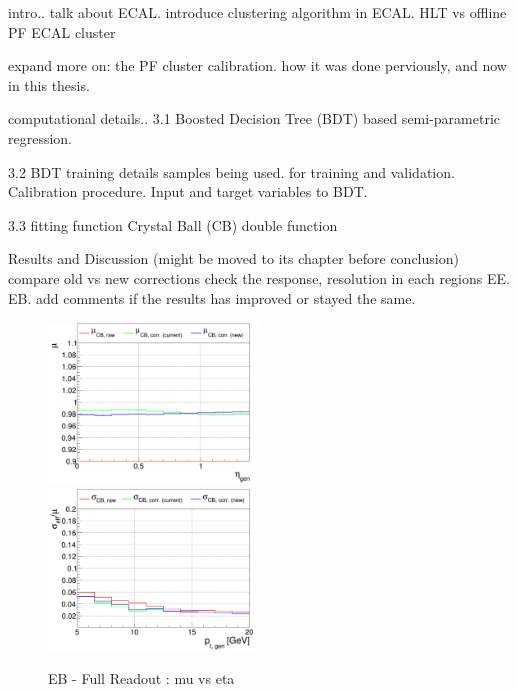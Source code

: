 
intro..
 talk about ECAL.
 introduce clustering algorithm in ECAL.
 HLT vs offline PF ECAL cluster

 expand more on:
  the PF cluster calibration.
  how it was done perviously, and now in this thesis.

computational details..
 3.1 Boosted Decision Tree (BDT)
  based semi-parametric regression.

 3.2 BDT training details
  samples being used. for training and validation.
  Calibration procedure. Input and target variables to BDT.

 3.3 fitting function
 Crystal Ball (CB) double function

Results and Discussion (might be moved to its chapter before conclusion)
 compare old vs new corrections
 check the response, resolution in each regions EE. EB. add comments if the results has improved or stayed the same.



\begin{figure}
\includegraphics[width=0.495\textwidth]{./ECAL_plots/plotsPU/EB/FULL/pdf/EBFULL_GENETA_0005_0020_MuOverBins.pdf}
\includegraphics[width=0.495\textwidth]{./ECAL_plots/plotsPU/EB/FULL/pdf/EBFULL_GENPT_0005_0020_EffSigmaOverBins.pdf}
\caption{EB - Full Readout : mu vs eta}
\end{figure}





